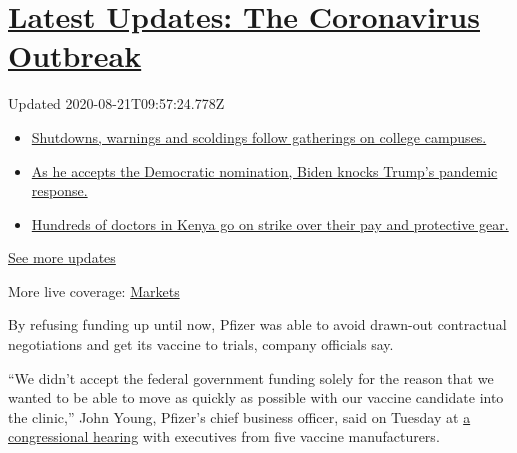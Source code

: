 \hypertarget{latest-updates-the-coronavirus-outbreak}{%
\section{\texorpdfstring{\href{https://www.nytimes3xbfgragh.onion/2020/08/21/world/covid-19-coronavirus.html?action=click\&pgtype=Article\&state=default\&region=MAIN_CONTENT_1\&context=storylines_live_updates}{Latest
Updates: The Coronavirus
Outbreak}}{Latest Updates: The Coronavirus Outbreak}}\label{latest-updates-the-coronavirus-outbreak}}

Updated 2020-08-21T09:57:24.778Z

\begin{itemize}
\tightlist
\item
  \href{https://www.nytimes3xbfgragh.onion/2020/08/21/world/covid-19-coronavirus.html?action=click\&pgtype=Article\&state=default\&region=MAIN_CONTENT_1\&context=storylines_live_updates\#link-4690b6aa}{Shutdowns,
  warnings and scoldings follow gatherings on college campuses.}
\item
  \href{https://www.nytimes3xbfgragh.onion/2020/08/21/world/covid-19-coronavirus.html?action=click\&pgtype=Article\&state=default\&region=MAIN_CONTENT_1\&context=storylines_live_updates\#link-324af071}{As
  he accepts the Democratic nomination, Biden knocks Trump's pandemic
  response.}
\item
  \href{https://www.nytimes3xbfgragh.onion/2020/08/21/world/covid-19-coronavirus.html?action=click\&pgtype=Article\&state=default\&region=MAIN_CONTENT_1\&context=storylines_live_updates\#link-35890b73}{Hundreds
  of doctors in Kenya go on strike over their pay and protective gear.}
\end{itemize}

\href{https://www.nytimes3xbfgragh.onion/2020/08/21/world/covid-19-coronavirus.html?action=click\&pgtype=Article\&state=default\&region=MAIN_CONTENT_1\&context=storylines_live_updates}{See
more updates}

More live coverage:
\href{https://www.nytimes3xbfgragh.onion/live/2020/08/20/business/stock-market-today-coronavirus?action=click\&pgtype=Article\&state=default\&region=MAIN_CONTENT_1\&context=storylines_live_updates}{Markets}

By refusing funding up until now, Pfizer was able to avoid drawn-out
contractual negotiations and get its vaccine to trials, company
officials say.

``We didn't accept the federal government funding solely for the reason
that we wanted to be able to move as quickly as possible with our
vaccine candidate into the clinic,'' John Young, Pfizer's chief business
officer, said on Tuesday at
\href{https://www.nytimes3xbfgragh.onion/2020/07/21/health/covid-19-vaccine-coronavirus-moderna-pfizer.html}{a
congressional hearing} with executives from five vaccine manufacturers.

